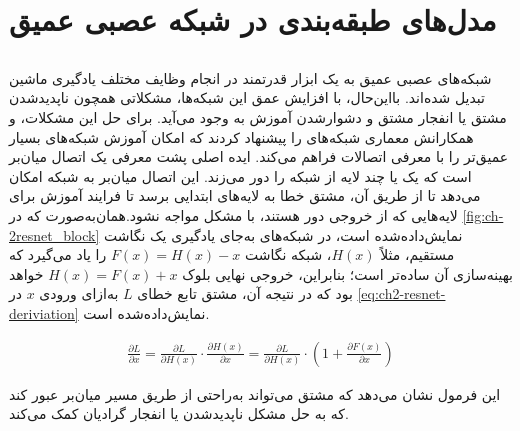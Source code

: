 \section{مدل‌های طبقه‌بندی در شبکه عصبی عمیق}

\subsection{}
\label{ResNet subsection}
شبکه‌های عصبی عمیق به یک ابزار قدرتمند در انجام وظایف مختلف یادگیری ماشین تبدیل شده‌اند. بااین‌حال، با افزایش عمق این شبکه‌ها، مشکلاتی همچون ناپدیدشدن مشتق
یا انفجار مشتق 
 و دشوارشدن آموزش به ‌وجود می‌آید. برای حل این مشکلات،
  \cite{he2016deep}
   و همکارانش معماری شبکه‌های 
   را پیشنهاد کردند که امکان آموزش شبکه‌های بسیار عمیق‌تر را با معرفی اتصالات 
   فراهم می‌کند.
ایده اصلی پشت 
 معرفی یک اتصال  میان‌بر
 است که یک یا چند لایه از شبکه را دور می‌زند. این اتصال  میان‌بر به شبکه امکان می‌دهد تا از طریق آن، مشتق خطا به لایه‌های ابتدایی برسد تا فرایند آموزش برای لایه‌هایی که از خروجی دور هستند، با مشکل مواجه نشود.همان‌به‌صورت که در 
 \autoref{fig:ch-2resnet_block}
 نمایش‌داده‌‌شده است، در شبکه‌های 
 به‌جای یادگیری یک نگاشت مستقیم، مثلاً $H(x)$، شبکه نگاشت $F(x) = H(x) - x$ را یاد می‌گیرد که بهینه‌سازی آن ساده‌تر است؛ بنابراین، خروجی نهایی بلوک
  $H(x) = F(x) + x$ خواهد بود که در نتیجه آن، مشتق
 تابع خطای $L$ به‌ازای ورودی $x$ در 
 \autoref{eq:ch2-resnet-deriviation}
 نمایش‌‌داده‌شده است.
 
\begin{latin}
\begin{equation}
\label{eq:ch2-resnet-deriviation}
\begin{aligned}
 \frac{\partial L}{\partial x} = \frac{\partial L}{\partial H(x)} \cdot \frac{\partial H(x)}{\partial x} = \frac{\partial L}{\partial H(x)} \cdot \left(1 + \frac{\partial F(x)}{\partial x}\right)
\end{aligned}
\end{equation}
\end{latin}

 
 این فرمول نشان می‌دهد که مشتق می‌تواند به‌راحتی از طریق مسیر  میان‌بر عبور کند که به حل مشکل ناپدیدشدن یا انفجار گرادیان کمک می‌کند.
 
